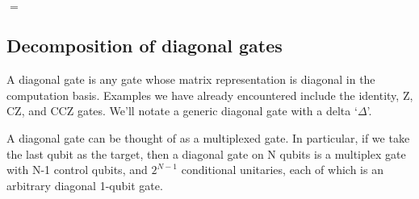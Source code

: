 \begin{center}
$ = $
\end{center}


\subsection{Decomposition of diagonal gates}

A diagonal gate is any gate whose matrix representation is diagonal in the computation basis. Examples we have already encountered include the identity, Z, CZ, and CCZ gates. We'll notate a generic diagonal gate with a delta `$\Delta$'.
\begin{center}
\end{center}
A diagonal gate can be thought of as a multiplexed gate. In particular, if we take the last qubit as the target, then a diagonal gate on N qubits is a multiplex gate with N-1 control qubits, and $2^{N-1}$ conditional unitaries, each of which is an arbitrary diagonal 1-qubit gate. 


